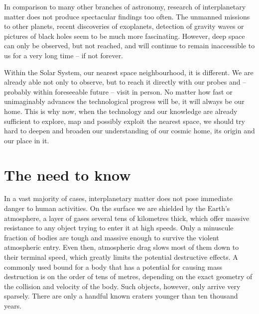 
In comparison to many other branches of astronomy, research of interplanetary matter
does not produce spectacular findings too often.
The unmanned missions to other planets, recent discoveries of exoplanets, detection of gravity waves
or pictures of black holes seem to be much more fascinating.
However, deep space can only be observed, but not reached, and will continue to remain
inaccessible to us for a very long time -- if not forever.

Within the Solar System, our nearest space neighbourhood, it is different. We are already able not only to observe,
but to reach it directly with our probes and -- probably within foreseeable future -- visit in person.
No matter how fast or unimaginably advances the technological progress will be, it will always be our home.
This is why now, when the technology and our knowledge are already sufficient to explore, map and possibly exploit
the nearest space, we should try hard to deepen and broaden our understanding of our cosmic home, its origin and our place in it.

\section{The need to know} \label{in}
    In a vast majority of cases, interplanetary matter does not pose immediate danger to human activities.
    On the surface we are shielded by the Earth's atmosphere, a layer of gases several tens of kilometres
    thick, which offer massive resistance to any object trying to enter it at high speeds.
    Only a minuscule fraction of bodies are tough and massive enough to survive the violent atmospheric entry.
    Even then, atmospheric drag slows most of them down to their terminal speed, which greatly limits the potential destructive effects.
    A commonly used bound for a body that has a potential for causing mass destruction is on the order of tens of metres,
    depending on the exact geometry of the collision and velocity of the body. Such objects, however, only arrive very sparsely.
    There are only a handful known craters younger than ten thousand years.

